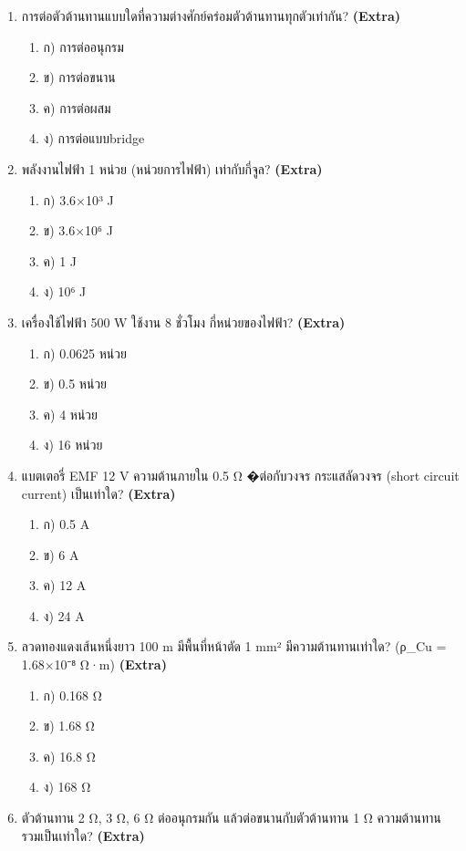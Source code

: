 \documentclass[12pt]{article}
\begin{document}
\begin{enumerate}[label=\arabic*.]
\begin{enumerate}[label=)]
\end{enumerate}
\item การต่อตัวต้านทานแบบใดที่ความต่างศักย์คร่อมตัวต้านทานทุกตัวเท่ากัน? \hfill \textbf{\small (Extra)}
\begin{enumerate}[label=)]
\item ก) การต่ออนุกรม
\item ข) การต่อขนาน
\item ค) การต่อผสม
\item ง) การต่อแบบbridge
\end{enumerate}
\item พลังงานไฟฟ้า 1 หน่วย (หน่วยการไฟฟ้า) เท่ากับกี่จูล? \hfill \textbf{\small (Extra)}
\begin{enumerate}[label=)]
\item ก) 3.6×10³ J
\item ข) 3.6×10⁶ J
\item ค) 1 J
\item ง) 10⁶ J
\end{enumerate}
\item เครื่องใช้ไฟฟ้า 500 W ใช้งาน 8 ชั่วโมง กี่หน่วยของไฟฟ้า? \hfill \textbf{\small (Extra)}
\begin{enumerate}[label=)]
\item ก) 0.0625 หน่วย
\item ข) 0.5 หน่วย
\item ค) 4 หน่วย
\item ง) 16 หน่วย
\end{enumerate}
\item แบตเตอรี่ EMF 12 V ความต้านภายใน 0.5 Ω �ต่อกับวงจร กระแสลัดวงจร (short circuit current) เป็นเท่าใด? \hfill \textbf{\small (Extra)}
\begin{enumerate}[label=)]
\item ก) 0.5 A
\item ข) 6 A
\item ค) 12 A
\item ง) 24 A
\end{enumerate}
\item ลวดทองแดงเส้นหนึ่งยาว 100 m มีพื้นที่หน้าตัด 1 mm² มีความต้านทานเท่าใด? (ρ\_Cu = 1.68×10⁻⁸ Ω·m) \hfill \textbf{\small (Extra)}
\begin{enumerate}[label=)]
\item ก) 0.168 Ω
\item ข) 1.68 Ω
\item ค) 16.8 Ω
\item ง) 168 Ω
\end{enumerate}
\item ตัวต้านทาน 2 Ω, 3 Ω, 6 Ω ต่ออนุกรมกัน แล้วต่อขนานกับตัวต้านทาน 1 Ω ความต้านทานรวมเป็นเท่าใด? \hfill \textbf{\small (Extra)}

\end{enumerate}
\end{document}
